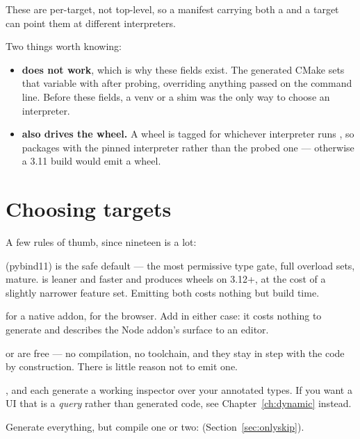 These are per-target, not top-level, so a manifest carrying both a
 and a  target can point them at different
interpreters.

Two things worth knowing:

\begin{itemize}
  \item \textbf{ does not work},
    which is why these fields exist. The generated CMake sets that variable with
     after probing, overriding anything passed on the
    command line. Before these fields, a venv or a  shim was the
    only way to choose an interpreter.
  \item \textbf{ also drives the wheel.} A wheel is tagged for
    whichever interpreter runs , so
     packages with the pinned interpreter
    rather than the probed one --- otherwise a 3.11 build would emit a
     wheel.
\end{itemize}

\section{Choosing targets}

A few rules of thumb, since nineteen is a lot:

\begin{description}[leftmargin=0cm,style=nextline,font=\normalfont\itshape]
  \item[Python]  (pybind11) is the safe default --- the most
    permissive type gate, full overload sets, mature.  is leaner
    and faster and produces  wheels on 3.12+, at the cost of a
    slightly narrower feature set. Emitting both costs nothing but build time.
  \item[JavaScript]  for a native addon,  for the browser.
    Add  in either case: it costs nothing to generate and
    describes the Node addon's surface to an editor.
  \item[Documentation]  or  are free --- no
    compilation, no toolchain, and they stay in step with the code by
    construction. There is little reason not to emit one.
  \item[A user interface] ,  and  each generate a
    working inspector over your annotated types. If you want a UI that is a
    \emph{query} rather than generated code, see Chapter~\ref{ch:dynamic}
    instead.
  \item[During development] Generate everything, but compile one or two:
     (Section~\ref{sec:onlyskip}).
\end{description}
